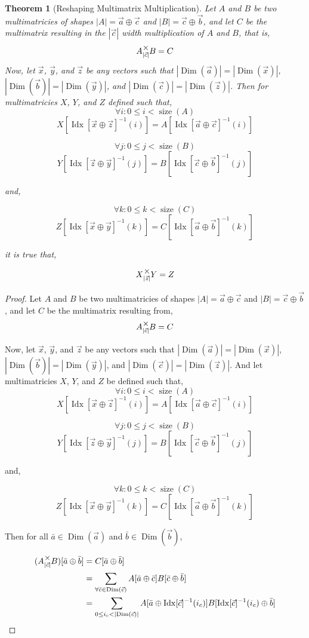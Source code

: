 \documentclass[12pt]{book}
\theoremstyle{plain}
\newtheorem{theorem}{Theorem}[chapter]
\theoremstyle{definition}
\theoremstyle{ppart}
\theoremstyle{case}
\theoremstyle{solution}
\DeclareMathOperator{\Dim}{Dim}
\DeclareMathOperator{\Idx}{Idx}
\DeclareMathOperator{\size}{size}
\newcommand{\mmult}[1]{\text{\raisebox{1ex}{$\underset{#1}{\times}$}}}
\newcommand{\shape}[1]{\left|#1\right|}
\begin{document}
\begin{landscape}
\begin{theorem}[Reshaping Multimatrix Multiplication]
Let $A$ and $B$ be two multimatricies of shapes $\shape{A} = \vec{a} \oplus \vec{c}$ and
$\shape{B} = \vec{c} \oplus \vec{b}$, and let $C$ be the multimatrix resulting in the $\shape{\vec{c}}$
width multiplication of $A$ and $B$, that is,
\[ A \mmult{\shape{\vec{c}}} B = C \]
Now, let $\vec{x}$, $\vec{y}$, and $\vec{z}$ be any vectors such that
$\shape{\Dim(\vec{a})} = \shape{\Dim(\vec{x})}$,
$\shape{\Dim(\vec{b})} = \shape{\Dim(\vec{y})}$,
and 
$\shape{\Dim(\vec{c})} = \shape{\Dim(\vec{z})}$.
Then for multimatricies $X$, $Y$, and $Z$ defined such that,
\[\forall i : 0 \le i < \size(A) \]
\[ X[\Idx[\vec{x} \oplus \vec{z}]^{-1}(i)] = A[\Idx[\vec{a} \oplus \vec{c}]^{-1}(i)] \]

\[\forall j : 0 \le j < \size(B)\]
\[ Y[\Idx[\vec{z} \oplus \vec{y}]^{-1}(j)] = B[\Idx[\vec{c} \oplus \vec{b}]^{-1}(j)] \]

and,

\[\forall k : 0 \le k < \size(C)\]
\[ Z[\Idx[\vec{x} \oplus \vec{y}]^{-1}(k)] = C[\Idx[\vec{a} \oplus \vec{b}]^{-1}(k)] \]

it is true that,

\[ X \mmult{\shape{\vec{z}}} Y = Z \]
\end{theorem}
\begin{proof}
Let $A$ and $B$ be two multimatricies of shapes $\shape{A} = \vec{a} \oplus \vec{c}$ and
$\shape{B} = \vec{c} \oplus \vec{b}$, and let $C$ be the multimatrix resulting from,
\[ A \mmult{\shape{\vec{c}}} B = C \]

Now, let $\vec{x}$, $\vec{y}$, and $\vec{z}$ be any vectors such that
$\shape{\Dim(\vec{a})} = \shape{\Dim(\vec{x})}$,
$\shape{\Dim(\vec{b})} = \shape{\Dim(\vec{y})}$,
and 
$\shape{\Dim(\vec{c})} = \shape{\Dim(\vec{z})}$.
And let multimatricies $X$, $Y$, and $Z$ be defined such that,
\[\forall i : 0 \le i < \size(A) \]
\[ X[\Idx[\vec{x} \oplus \vec{z}]^{-1}(i)] = A[\Idx[\vec{a} \oplus \vec{c}]^{-1}(i)] \]

\[\forall j : 0 \le j < \size(B)\]
\[ Y[\Idx[\vec{z} \oplus \vec{y}]^{-1}(j)] = B[\Idx[\vec{c} \oplus \vec{b}]^{-1}(j)] \]

and,

\[\forall k : 0 \le k < \size(C)\]
\[ Z[\Idx[\vec{x} \oplus \vec{y}]^{-1}(k)] = C[\Idx[\vec{a} \oplus \vec{b}]^{-1}(k)] \]

Then for all $\bar{a} \in \Dim(\vec{a})$ and $\bar{b} \in \Dim(\vec{b})$,

\begin{align*}
  (A \mmult{\shape{\vec{c}}} B)[\bar{a} \oplus \bar{b}]
  &= C[\bar{a} \oplus \bar{b}] \\
  &=
  \sum_{\forall \bar{c} \in \Dim(\vec{c})} A[\bar{a} \oplus \bar{c}] B[\bar{c} \oplus \bar{b}] \\
  &=
  \sum_{0 \le i_c < \shape{\Dim(\vec{c})}} A[\bar{a} \oplus \Idx[\vec{c}]^{-1}(i_c)] B[\Idx[\vec{c}]^{-1}(i_c) \oplus \bar{b}]
\end{align*}


\end{proof}
\end{landscape}
\end{document}
